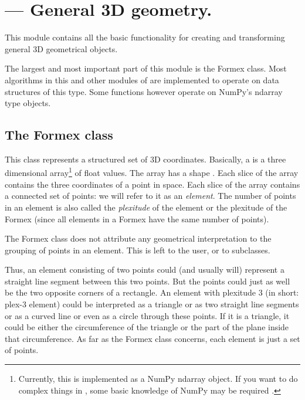 

\section{ --- General 3D geometry.}
\label{sec:formex}


This module contains all the basic functionality for creating and transforming general 3D geometrical objects.

The largest and most important part of this module is the Formex class. Most algorithms in this and other modules of \pyformex are implemented to operate on data structures of this type. Some functions however operate on NumPy's ndarray type objects.
 

\subsection{The Formex class}
This class represents a structured set of 3D coordinates. Basically, a  is a three dimensional array\footnote{Currently, this is implemented as a NumPy ndarray object. If you want to do complex things in \pyformex, some basic knowledge of NumPy may be required .} of float values. The array has a shape . Each slice \Code{[i,j]} of the array contains the three coordinates of a point in space. Each slice \Code{[i]} of the array contains a connected set of  points: we will refer to it as an \emph{element}. The number of points in an element is also called the \emph{plexitude} of the element or the plexitude of the Formex (since all elements in a Formex have the same number of points). 

The Formex class does not attribute any geometrical interpretation to the grouping of points in an element. This is left to the user, or to subclasses.

Thus, an element consisting of two points could (and usually will) represent a straight line segment between this two points. But the points could just as well be the two opposite corners of a rectangle.
An element with plexitude 3 (in short: plex-3 element) could be interpreted as a triangle or as two straight line segments or as a curved line or even as a circle through these points. If it is a triangle, it could be either the circumference of the triangle or the part of the plane inside that circumference. As far as the Formex class concerns, each element is just a set of points. 

